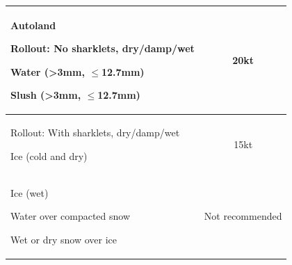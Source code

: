 \documentclass[twoside]{article}
\begin{document}
{\begin{center}
\begin{tabular}{|l|c|}
{    \vspace{1mm}
    \begin{compactitem}
     \item Autoland
     \item Rollout: No sharklets, dry/damp/wet
     \item Water (>3mm, $\leq$12.7mm)
     \item Slush (>3mm, $\leq$12.7mm)
    \end{compactitem}
    \vspace{1mm}} & 20kt\\\hline
  \parbox{0.5\textwidth}{
    \vspace{1mm}
    \begin{compactitem}
     \item Rollout:  With sharklets, dry/damp/wet
     \item Ice (cold and dry)
    \end{compactitem}
    \vspace{1mm}} & 15kt\\\hline
  \parbox{0.5\textwidth}{
    \vspace{1mm}
    \begin{compactitem}
     \item Ice (wet)
     \item Water over compacted snow
     \item Wet or dry snow over ice
    \end{compactitem}
    \vspace{1mm}} & Not recommended\\\hline
\end{tabular}
\end{center}}
\end{document}
